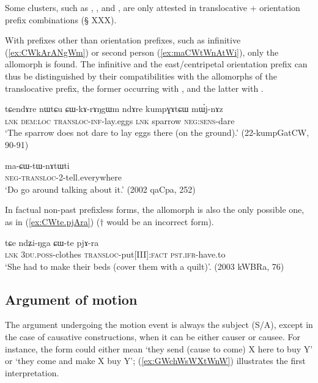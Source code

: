 Some clusters, such as , , and , are only attested in translocative + orientation prefix combinations (§ XXX).

With prefixes other than orientation prefixes, such as infinitive  (\ref{ex:CWkArANgWm}) or second person  (\ref{ex:maCWtWnAtWi}), only the allomorph  is found. The infinitive  and the east/centripetal orientation prefix  can thus be distinguished by their compatibilities with the allomorphs of the translocative prefix, the former occurring with , and the latter with .

\begin{exe}
\ex \label{ex:CWkArANgWm}
 \gll tɕendɤre nɯtɕu ɕɯ-kɤ-rɤŋgɯm ndɤre kumpɣɤtɕɯ mɯ́j-nɤz \\
 \textsc{lnk} \textsc{dem}:\textsc{loc} \textsc{transloc}-\textsc{inf}-lay.eggs \textsc{lnk} sparrow \textsc{neg}:\textsc{sens}-dare \\
 \glt `The sparrow does not dare to lay eggs there (on the ground).' (22-kumpGatCW, 90-91)
\end{exe}

\begin{exe}
\ex  \label{ex:maCWtWnAtWi}
 \gll ma-ɕɯ-tɯ-nɤtɯti \\
 \textsc{neg}-\textsc{transloc}-2-tell.everywhere \\
 \glt `Do go around talking about it.' (2002 qaCpa, 252)
\end{exe}

In factual non-past prefixless forms, the allomorph  is also the only possible one, as in (\ref{ex:CWte.pjAra}) ($\dagger$ would be an incorrect form).

\begin{exe}
\ex  \label{ex:CWte.pjAra}
 \gll  tɕe ndʑi-ŋga ɕɯ-te pjɤ-ra \\
 \textsc{lnk} \textsc{3du}.\textsc{poss}-clothes \textsc{transloc}-put[III]:\textsc{fact} \textsc{pst}.\textsc{ifr}-have.to \\
 \glt `She had to make their beds (cover them with a quilt)'. (2003 kWBRa, 76)
\end{exe}

\subsection{Argument of motion}
The argument undergoing the motion event is always the subject (S/A), except in the case of causative constructions, when it can be either causer or causee. For instance, the form  could either mean `they send (cause to come) X here to buy Y' or `they come and make X buy Y'; (\ref{ex:GWchWsWXtWnW}) illustrates the first interpretation.


